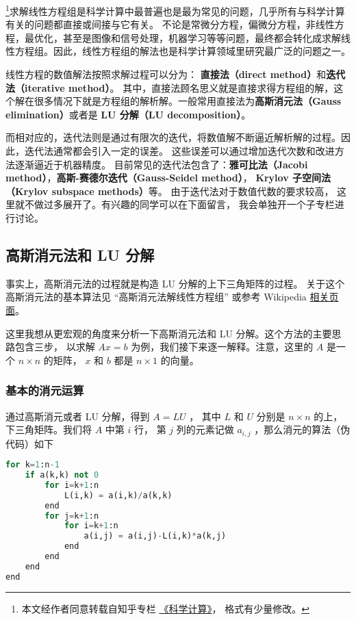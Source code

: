 

\footnote{本文经作者同意转载自知乎专栏 \href{https://www.zhihu.com/column/c_1226443594048942080}{《科学计算》}， 格式有少量修改。}求解线性方程组是科学计算中最普遍也是最为常见的问题，几乎所有与科学计算有关的问题都直接或间接与它有关。 不论是常微分方程，偏微分方程，非线性方程，最优化，甚至是图像和信号处理，机器学习等等问题，最终都会转化成求解线性方程组。因此，线性方程组的解法也是科学计算领域里研究最广泛的问题之一。

线性方程的数值解法按照求解过程可以分为： \textbf{直接法（direct method）}和\textbf{迭代法（iterative method）}。 其中，直接法顾名思义就是直接求得方程组的解，这个解在很多情况下就是方程组的解析解。一般常用直接法为\textbf{高斯消元法（Gauss elimination）}或者是 \textbf{LU 分解（LU decomposition）}。

而相对应的，迭代法则是通过有限次的迭代，将数值解不断逼近解析解的过程。因此，迭代法通常都会引入一定的误差。 这些误差可以通过增加迭代次数和改进方法逐渐逼近于机器精度。 目前常见的迭代法包含了：\textbf{雅可比法（Jacobi method）}，\textbf{高斯-赛德尔迭代（Gauss-Seidel method）}， \textbf{Krylov 子空间法（Krylov subspace methods）}等。 由于迭代法对于数值代数的要求较高， 这里就不做过多展开了。有兴趣的同学可以在下面留言， 我会单独开一个子专栏进行讨论。

\subsection{高斯消元法和 LU 分解}

事实上，高斯消元法的过程就是构造 LU 分解的上下三角矩阵的过程。 关于这个高斯消元法的基本算法见 “高斯消元法解线性方程组” 或参考 Wikipedia \href{https://en.wikipedia.org/wiki/Gaussian_elimination}{相关页面}。

这里我想从更宏观的角度来分析一下高斯消元法和 LU 分解。这个方法的主要思路包含三步， 以求解 $Ax=b$ 为例，我们接下来逐一解释。注意，这里的 $A$  是一个 $n\times n$ 的矩阵， $x$ 和 $b$ 都是 $n\times1$ 的向量。

\subsubsection{基本的消元运算}

通过高斯消元或者 LU 分解，得到 $A=LU$ ， 其中 $L$ 和 $U $ 分别是 $n\times n$ 的上，下三角矩阵。我们将 $A$ 中第 $i$ 行， 第 $j$ 列的元素记做 $a_{i,j}$ ，那么消元的算法（伪代码）如下
\begin{lstlisting}[language=python]
for k=1:n-1
    if a(k,k) not 0
        for i=k+1:n
            L(i,k) = a(i,k)/a(k,k)
        end
        for j=k+1:n
            for i=k+1:n
                a(i,j) = a(i,j)-L(i,k)*a(k,j)
            end
        end
    end
end
\end{lstlisting}


